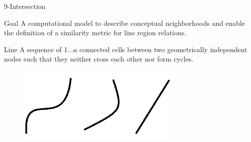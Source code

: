 

\begin{frame}{9-Intersection}
	\begin{block}{Goal} 
	A computational model to describe conceptual neighborhoods and enable the definition of a similarity metric for line region relations.
		\end{block}
	\begin{block}{Line}
	A sequence of 1...n connected cells between two geometrically independent nodes such that they neither cross each other nor form cycles.
\end{block}		
		\begin{figure}
		\includegraphics[width=0.7\textwidth]{images/line.png}
\end{figure}			
\end{frame}

